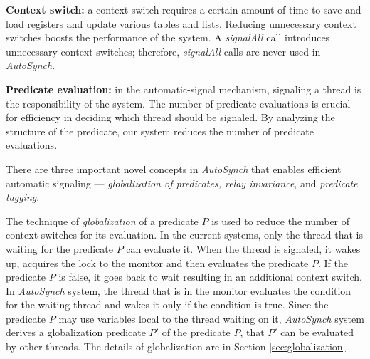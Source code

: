 \documentclass[preprint]{sigplanconf}
\begin{document}
\begin{description}
    \item{\bf Context switch:} a context switch requires a certain 
        amount of time to save and load registers and update various tables and
        lists. Reducing unnecessary context switches boosts the performance of the system.
        A {\em signalAll} call introduces unnecessary context switches; therefore,
        {\em signalAll} calls are never used in {\em AutoSynch}. 
    \item {\bf Predicate evaluation:} in the 
        automatic-signal mechanism, signaling a thread is the 
        responsibility of the system. The number of predicate evaluations is 
        crucial for efficiency in deciding which thread should be signaled. 
        By analyzing the structure of the predicate, our system reduces the number of predicate evaluations.
\end{description}


There are three important novel concepts in {\em AutoSynch} that enables efficient automatic
signaling --- {\em globalization of predicates, relay invariance}, and {\em predicate
tagging}.

The technique of {\em globalization} of a predicate $P$ is used to reduce the number of 
context switches for its evaluation. In the current systems, only the thread that is waiting
for the predicate $P$ can evaluate it. When the thread is signaled, it wakes up, acquires the
lock to the monitor and then evaluates the predicate $P$. If the predicate $P$ is false, it
goes back to wait resulting in an additional context switch. In {\em AutoSynch} system, the thread
that is in the monitor evaluates the condition for the waiting thread and wakes it only
if the condition is true. Since the predicate $P$ may use variables local to the thread
waiting on it, {\em AutoSynch} system derives a globalization predicate $P'$ of
the predicate $P$, that $P'$ can be evaluated by other threads. 
The details of globalization are in Section \ref{sec:globalization}.

\end{document}
